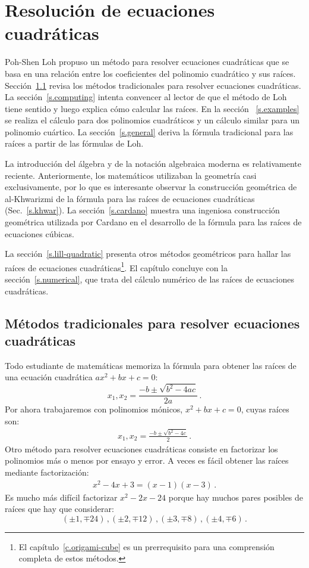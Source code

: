 
\chapter{Resolución de ecuaciones cuadráticas}\label{c.quadratic}


Poh-Shen Loh propuso un método para resolver ecuaciones cuadráticas que se basa en una relación entre los coeficientes del polinomio cuadrático y sus raíces. Sección~\ref{s.traditional} revisa los métodos tradicionales para resolver ecuaciones cuadráticas. 
La sección~\ref{s.computing} intenta convencer al lector de que el método de Loh tiene sentido y luego explica cómo calcular las raíces. En la sección ~\ref{s.examples} se realiza el cálculo para dos polinomios cuadráticos y un cálculo similar para un polinomio cuártico. La sección~\ref{s.general} deriva la fórmula tradicional para las raíces a partir de las fórmulas de Loh.

La introducción del álgebra y de la notación algebraica moderna es relativamente reciente. Anteriormente, los matemáticos utilizaban la geometría casi exclusivamente, por lo que es interesante observar la construcción geométrica de al-Khwarizmi de la fórmula para las raíces de ecuaciones cuadráticas (Sec.~\ref{s.khwar}). La sección~\ref{s.cardano} muestra una ingeniosa construcción geométrica utilizada por Cardano en el desarrollo de la fórmula para las raíces de ecuaciones cúbicas.

La sección~\ref{s.lill-quadratic} presenta otros métodos geométricos para hallar las raíces de ecuaciones cuadráticas\footnote{El capítulo~\ref{c.origami-cube} es un prerrequisito para una comprensión completa de estos métodos.}. El capítulo concluye con la sección~\ref{s.numerical}, que trata del cálculo numérico de las raíces de ecuaciones cuadráticas.

\section{Métodos tradicionales para resolver ecuaciones cuadráticas}\label{s.traditional}
Todo estudiante de matemáticas memoriza la fórmula para obtener las raíces de una ecuación cuadrática $ax^2+bx+c=0$:
\[
x_1, x_2 = \frac{-b\pm\sqrt{b^2-4ac}}{2a}\,.
\]                      
Por ahora trabajaremos con polinomios mónicos, $x^2+bx+c=0$, cuyas raíces son:
\begin{align}
x_1, x_2 = \frac{-b\pm\sqrt{b^2-4c}}{2}\,.\label{eq.quadratic-roots}
\end{align}
Otro método para resolver ecuaciones cuadráticas consiste en factorizar los polinomios más o menos por ensayo y error. A veces es fácil obtener las raíces mediante factorización:
\begin{align}
x^2-4x+3= (x-1)(x-3)\label{eq.quadratic-lill}\,.
\end{align}
Es mucho más difícil factorizar $x^2-2x-24$ porque hay muchos pares posibles de raíces que hay que considerar:
\[
(\pm 1,\mp 24)\,, (\pm 2,\mp 12)\,, (\pm 3,\mp 8)\,, (\pm 4,\mp 6)\,.
\]

